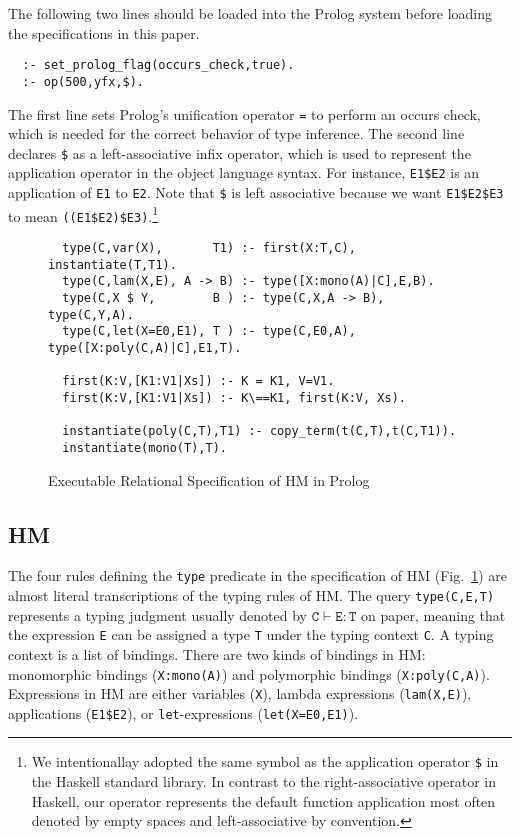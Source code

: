 \documentclass[runningheads,a4paper]{llncs}
\begin{document}
The following two lines should be loaded into the Prolog system
before loading the specifications in this paper. {\small\vspace*{-1ex}
\begin{verbatim}
  :- set_prolog_flag(occurs_check,true).
  :- op(500,yfx,$).
\end{verbatim} \vspace*{-.7ex} }\noindent
The first line sets Prolog's unification operator \verb|=| to perform an
occurs check, which is needed for the correct behavior of type inference.
The second line declares \verb|$| as a left-associative infix operator,
which is used to represent the application operator in the object language
syntax. For instance, {\small\verb|E1$E2|} is an application of
{\small\verb|E1|} to {\small\verb|E2|}. Note that \verb|$| is left associative
because we want \verb|E1$E2$E3| to mean \verb|((E1$E2)$E3)|.\footnote{
	We intentionallay adopted the same symbol as the application operator
	\texttt{\$} in the Haskell standard library. In contrast to the
	right-associative operator in Haskell, our operator represents
	the default function application most often denoted by empty spaces
	and left-associative by convention.}

\begin{figure}[b]
\begin{verbatim}
  type(C,var(X),       T1) :- first(X:T,C), instantiate(T,T1).
  type(C,lam(X,E), A -> B) :- type([X:mono(A)|C],E,B).
  type(C,X $ Y,        B ) :- type(C,X,A -> B), type(C,Y,A).
  type(C,let(X=E0,E1), T ) :- type(C,E0,A), type([X:poly(C,A)|C],E1,T).

  first(K:V,[K1:V1|Xs]) :- K = K1, V=V1.
  first(K:V,[K1:V1|Xs]) :- K\==K1, first(K:V, Xs).
  
  instantiate(poly(C,T),T1) :- copy_term(t(C,T),t(C,T1)).
  instantiate(mono(T),T).
\end{verbatim}
\vspace*{-3ex}
\caption{Executable Relational Specification of HM in Prolog}
\label{fig:HM}
\vspace*{-2ex}
\end{figure}
\subsection{HM}\label{ssec:HM}
The four rules defining the {\small\verb|type|} predicate in the specification
of HM (Fig.~\ref{fig:HM}) are almost literal transcriptions of the typing rules
of HM. The query {\small\verb|type(C,E,T)|} represents a typing judgment usually
denoted by $\texttt{C}\vdash\texttt{E}:\texttt{T}$ on paper, meaning that
the expression {\small\verb|E|} can be assigned a type {\verb|T|} under the
typing context {\small\verb|C|}. A typing
context is a list of bindings. There are two kinds of bindings in HM: 
monomorphic bindings ({\small\verb|X:mono(A)|}) and
polymorphic bindings ({\small\verb|X:poly(C,A)|}).
Expressions in HM are either variables ({\small\verb|X|}), lambda expressions
({\small\verb|lam(X,E)|}), applications ({\small\verb|E1$E2|}), or
\texttt{let}-expressions ({\small\verb|let(X=E0,E1)|}).
\end{document}
